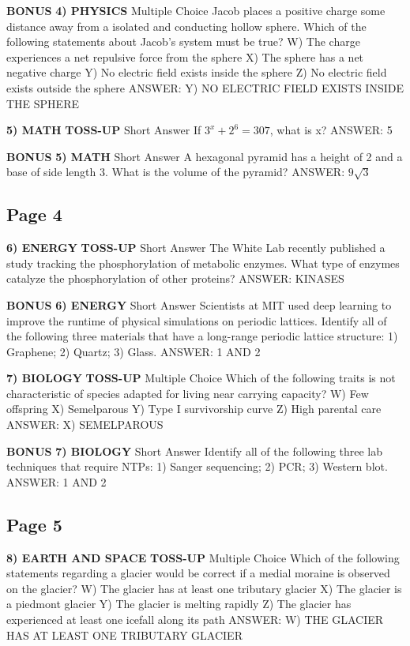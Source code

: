 \documentclass{article}
\begin{document}
\textbf{BONUS}
\textbf{4) PHYSICS}
Multiple Choice Jacob places a positive charge some distance away from a isolated and conducting hollow sphere. Which of the following statements about Jacob's system must be true?
W) The charge experiences a net repulsive force from the sphere
X) The sphere has a net negative charge
Y) No electric field exists inside the sphere
Z) No electric field exists outside the sphere
ANSWER: Y) NO ELECTRIC FIELD EXISTS INSIDE THE SPHERE

\textbf{5) MATH}
\textbf{TOSS-UP}
Short Answer If $3^{x}+2^{6}=307$, what is x?
ANSWER: 5

\textbf{BONUS}
\textbf{5) MATH}
Short Answer A hexagonal pyramid has a height of 2 and a base of side length 3. What is the volume of the pyramid?
ANSWER: $9\sqrt{3}$

\subsection*{Page 4}
\textbf{6) ENERGY}
\textbf{TOSS-UP}
Short Answer The White Lab recently published a study tracking the phosphorylation of metabolic enzymes. What type of enzymes catalyze the phosphorylation of other proteins?
ANSWER: KINASES

\textbf{BONUS}
\textbf{6) ENERGY}
Short Answer Scientists at MIT used deep learning to improve the runtime of physical simulations on periodic lattices. Identify all of the following three materials that have a long-range periodic lattice structure: 1) Graphene; 2) Quartz; 3) Glass.
ANSWER: 1 AND 2

\textbf{7) BIOLOGY}
\textbf{TOSS-UP}
Multiple Choice Which of the following traits is not characteristic of species adapted for living near carrying capacity?
W) Few offspring
X) Semelparous
Y) Type I survivorship curve
Z) High parental care
ANSWER: X) SEMELPAROUS

\textbf{BONUS}
\textbf{7) BIOLOGY}
Short Answer Identify all of the following three lab techniques that require NTPs: 1) Sanger sequencing; 2) PCR; 3) Western blot.
ANSWER: 1 AND 2

\subsection*{Page 5}
\textbf{8) EARTH AND SPACE}
\textbf{TOSS-UP}
Multiple Choice Which of the following statements regarding a glacier would be correct if a medial moraine is observed on the glacier?
W) The glacier has at least one tributary glacier
X) The glacier is a piedmont glacier
Y) The glacier is melting rapidly
Z) The glacier has experienced at least one icefall along its path
ANSWER: W) THE GLACIER HAS AT LEAST ONE TRIBUTARY GLACIER
\end{document}
